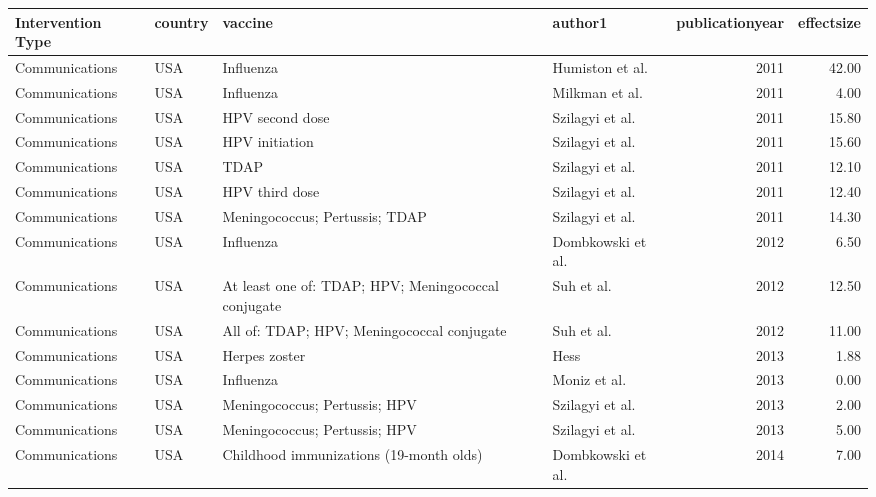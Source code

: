 
\begin{tabular}{llllrr}
\toprule
Intervention Type & country & vaccine & author1 & publicationyear & effectsize\\
\midrule
Communications & USA & Influenza & Humiston et al. & 2011 & 42.00\\
Communications & USA & Influenza & Milkman et al. & 2011 & 4.00\\
Communications & USA & HPV second dose & Szilagyi et al. & 2011 & 15.80\\
Communications & USA & HPV initiation & Szilagyi et al. & 2011 & 15.60\\
Communications & USA & TDAP & Szilagyi et al. & 2011 & 12.10\\
\addlinespace
Communications & USA & HPV third dose & Szilagyi et al. & 2011 & 12.40\\
Communications & USA & Meningococcus; Pertussis; TDAP & Szilagyi et al. & 2011 & 14.30\\
Communications & USA & Influenza & Dombkowski et al. & 2012 & 6.50\\
Communications & USA & At least one of: TDAP; HPV; Meningococcal conjugate & Suh et al. & 2012 & 12.50\\
Communications & USA & All of: TDAP; HPV; Meningococcal conjugate & Suh et al. & 2012 & 11.00\\
\addlinespace
Communications & USA & Herpes zoster & Hess & 2013 & 1.88\\
Communications & USA & Influenza & Moniz et al. & 2013 & 0.00\\
Communications & USA & Meningococcus; Pertussis; HPV & Szilagyi et al. & 2013 & 2.00\\
Communications & USA & Meningococcus; Pertussis; HPV & Szilagyi et al. & 2013 & 5.00\\
Communications & USA & Childhood immunizations (19-month olds) & Dombkowski et al. & 2014 & 7.00\\
\bottomrule
\end{tabular}
